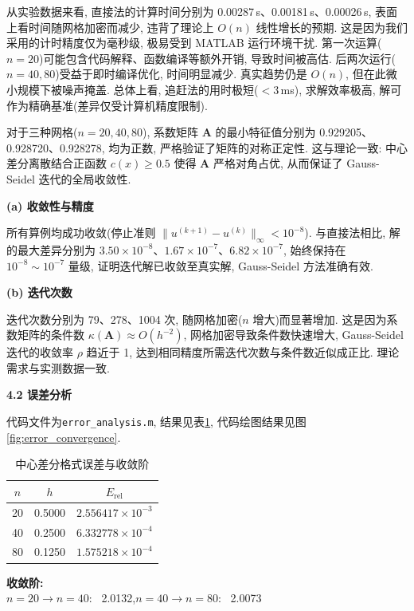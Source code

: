 \documentclass[zihao=-4,a4paper]{ctexart}
\begin{document}
从实验数据来看, 直接法的计算时间分别为 0.00287\,s、0.00181\,s、0.00026\,s, 表面上看时间随网格加密而减少, 违背了理论上 $O(n)$ 线性增长的预期. 这是因为我们采用的计时精度仅为毫秒级, 极易受到 MATLAB 运行环境干扰. 第一次运算($n=20$)可能包含代码解释、函数编译等额外开销, 导致时间被高估. 后两次运行($n=40,80$)受益于即时编译优化, 时间明显减少. 真实趋势仍是 $O(n)$, 但在此微小规模下被噪声掩盖. 总体上看, 追赶法的用时极短($<3$\,ms), 求解效率极高, 解可作为精确基准(差异仅受计算机精度限制). 

对于三种网格($n=20,40,80$), 系数矩阵 $\bm{A}$ 的最小特征值分别为 0.929205、0.928720、0.928278, 均为正数, 严格验证了矩阵的对称正定性. 这与理论一致: 中心差分离散结合正函数 $c(x)\ge 0.5$ 使得 $\bm{A}$ 严格对角占优, 从而保证了 Gauss-Seidel 迭代的全局收敛性. 

\textbf{(a) 收敛性与精度}

所有算例均成功收敛(停止准则 $\|u^{(k+1)}-u^{(k)}\|_\infty<10^{-8}$). 与直接法相比, 解的最大差异分别为 $3.50\times10^{-8}$、$1.67\times10^{-7}$、$6.82\times10^{-7}$, 始终保持在 $10^{-8}\sim10^{-7}$ 量级, 证明迭代解已收敛至真实解, Gauss-Seidel 方法准确有效. 

\textbf{(b) 迭代次数}

迭代次数分别为 79、278、1004 次, 随网格加密($n$ 增大)而显著增加. 这是因为系数矩阵的条件数 $\kappa(\bm{A})\approx O(h^{-2})$, 网格加密导致条件数快速增大, Gauss-Seidel 迭代的收敛率 $\rho$ 趋近于 1, 达到相同精度所需迭代次数与条件数近似成正比. 理论需求与实测数据一致. 

\noindent\textbf{4.2 误差分析}

代码文件为\texttt{error\_analysis.m}, 结果见表\ref{tab:center_diff_error}, 代码绘图结果见图\ref{fig:error_convergence}.
\begin{table}[htbp]
  \centering
  \caption{中心差分格式误差与收敛阶}
  \label{tab:center_diff_error}
  \begin{tabular}{ccc}
    \toprule
    $n$ & $h$ & $E_{\text{rel}}$ \\
    \midrule
    20 & 0.5000 & $2.556417 \times 10^{-3}$ \\
    40 & 0.2500 & $6.332778 \times 10^{-4}$ \\
    80 & 0.1250 & $1.575218 \times 10^{-4}$ \\
    \bottomrule
  \end{tabular}

  \vspace{0.8em}
  \textbf{收敛阶:} \\
  $n=20 \to n=40$: \ 2.0132,\quad $n=40 \to n=80$: \ 2.0073
\end{table}
\end{document}
